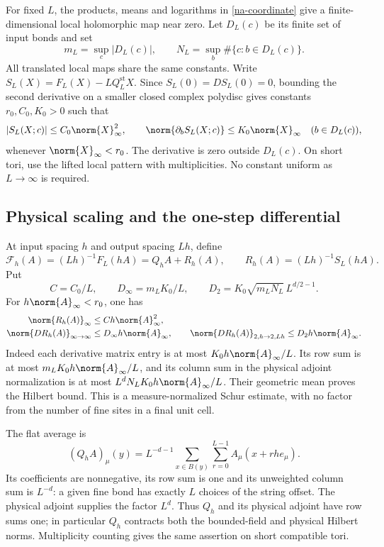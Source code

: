 For fixed $L$, the products, means and logarithms in
\eqref{na-coordinate} give a finite-dimensional local holomorphic
map near zero. Let $D_L(c)$ be its finite set of input bonds and set
\[
 m_L=\sup_c|D_L(c)|,\qquad
 N_L=\sup_b\#\{c:b\in D_L(c)\}.
\]
All translated local maps share the same constants. Write
$S_L(X)=F_L(X)-LQ_L^{\mathrm{st}}X$. Since
$S_L(0)=DS_L(0)=0$, bounding the second derivative on a smaller
closed complex polydisc gives constants $r_0,C_0,K_0>0$ such that
\begin{equation}
 |S_L(X;c)|\le C_0\norm{X}_\infty^2,
 \qquad
 \norm{\partial_bS_L(X;c)}\le K_0\norm{X}_\infty
 \quad (b\in D_L(c)),
 \label{na-local-jet-bounds}
\end{equation}
whenever $\norm{X}_\infty<r_0$. The derivative is zero outside
$D_L(c)$. On short tori, use the lifted local pattern with
multiplicities. No constant uniform as $L\to\infty$ is required.

\subsection{Physical scaling and the one-step differential}
\label{na-one-step}

At input spacing $h$ and output spacing $Lh$, define
\begin{equation}
 \mathcal F_h(A)=(Lh)^{-1}F_L(hA)=Q_hA+R_h(A),
 \qquad R_h(A)=(Lh)^{-1}S_L(hA).
 \label{na-physical-map}
\end{equation}
Put
\[
 C=C_0/L,\qquad D_\infty=m_LK_0/L,\qquad
 D_2=K_0\sqrt{m_LN_L}\,L^{d/2-1}.
\]
For $h\norm{A}_\infty<r_0$, one has
\begin{align}
 \norm{R_h(A)}_\infty&\le Ch\norm{A}_\infty^2,
 \label{na-one-step-rem}\\
 \norm{DR_h(A)}_{\infty\to\infty}
    &\le D_\infty h\norm{A}_\infty,
 \qquad
 \norm{DR_h(A)}_{2,h\to2,Lh}
    \le D_2h\norm{A}_\infty.
 \label{na-one-step-der}
\end{align}
Indeed each derivative matrix entry is at most
$K_0h\norm{A}_\infty/L$. Its row sum is at most
$m_LK_0h\norm{A}_\infty/L$, and its column sum in the physical
adjoint normalization is at most
$L^dN_LK_0h\norm{A}_\infty/L$. Their geometric mean proves the
Hilbert bound. This is a measure-normalized Schur estimate, with no
factor from the number of fine sites in a final unit cell.

The flat average is
\[
 (Q_hA)_\mu(y)=L^{-d-1}\sum_{x\in B(y)}\sum_{r=0}^{L-1}
                         A_\mu(x+rh e_\mu).
\]
Its coefficients are nonnegative, its row sum is one and its
unweighted column sum is $L^{-d}$: a given fine bond has exactly
$L$ choices of the string offset. The physical adjoint supplies the
factor $L^d$. Thus $Q_h$ and its physical adjoint have row sums one;
in particular $Q_h$ contracts both the bounded-field and physical
Hilbert norms. Multiplicity counting gives the same assertion on
short compatible tori.

